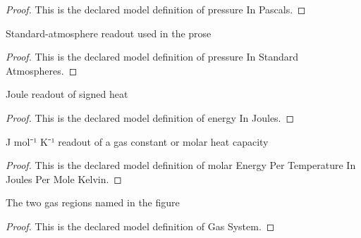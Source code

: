 \begin{proof}
  This is the declared model definition of pressure In Pascals.
\end{proof}
\begin{definition}
  \label{def:physics:phyx-mini-0436:phyxminiproblems-problemphyxmini0436-pressureinstandardatmospheres}
  Standard-atmosphere readout used in the prose
\end{definition}
\begin{proof}
  This is the declared model definition of pressure In Standard Atmospheres.
\end{proof}
\begin{definition}
  \label{def:physics:phyx-mini-0436:phyxminiproblems-problemphyxmini0436-energyinjoules}
  Joule readout of signed heat
\end{definition}
\begin{proof}
  This is the declared model definition of energy In Joules.
\end{proof}
\begin{definition}
  \label{def:physics:phyx-mini-0436:phyxminiproblems-problemphyxmini0436-molarenergypertemperatureinjoulespermolekelvin}
  J mol⁻¹ K⁻¹ readout of a gas constant or molar heat capacity
\end{definition}
\begin{proof}
  This is the declared model definition of molar Energy Per Temperature In Joules Per Mole Kelvin.
\end{proof}
\begin{definition}
  \label{def:physics:phyx-mini-0436:phyxminiproblems-problemphyxmini0436-gassystem}
  The two gas regions named in the figure
\end{definition}
\begin{proof}
  This is the declared model definition of Gas System.
\end{proof}
